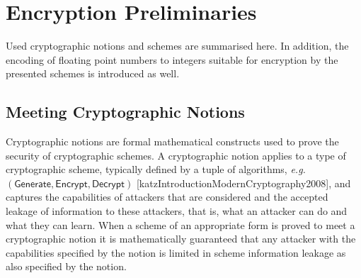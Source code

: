 % 
%                                                                                                      
%                                                                                                      
%                                                                                                      
% 

\section{Encryption Preliminaries}\label{sec:prelims:crypto_prelims}
Used cryptographic notions and schemes are summarised here. In addition, the encoding of floating point numbers to integers suitable for encryption by the presented schemes is introduced as well.

% 
% 

\subsection{Meeting Cryptographic Notions}\label{subsec:prelims:crypto_notions}
Cryptographic notions are formal mathematical constructs used to prove the security of cryptographic schemes. A cryptographic notion applies to a type of cryptographic scheme, typically defined by a tuple of algorithms, \textit{e.g.} $(\mathsf{Generate},\mathsf{Encrypt},\mathsf{Decrypt})$ [katzIntroductionModernCryptography2008], and captures the capabilities of attackers that are considered and the accepted leakage of information to these attackers, that is, what an attacker can do and what they can learn. When a scheme of an appropriate form is proved to meet a cryptographic notion it is mathematically guaranteed that any attacker with the capabilities specified by the notion is limited in scheme information leakage as also specified by the notion.

